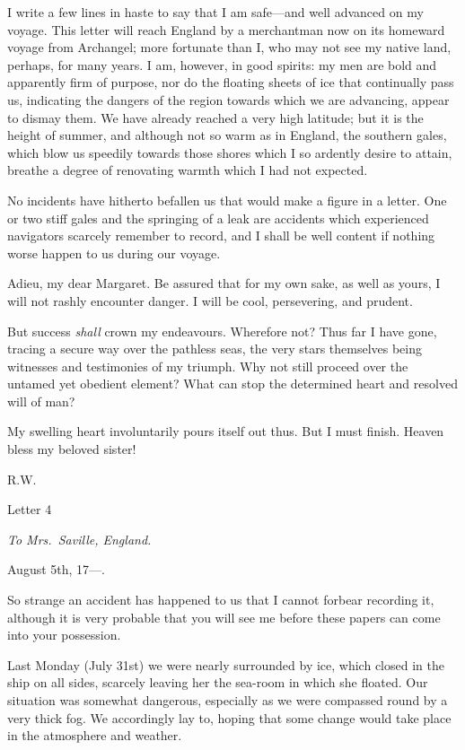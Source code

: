 \documentclass[12pt,openright]{book}
\begin{document}
I write a few lines in haste to say that I am safe—and well advanced on my voyage. This letter will reach England by a merchantman now on its homeward voyage from Archangel; more fortunate than I, who may not see my native land, perhaps, for many years. I am, however, in good spirits: my men are bold and apparently firm of purpose, nor do the floating sheets of ice that continually pass us, indicating the dangers of the region towards which we are advancing, appear to dismay them. We have already reached a very high latitude; but it is the height of summer, and although not so warm as in England, the southern gales, which blow us speedily towards those shores which I so ardently desire to attain, breathe a degree of renovating warmth which I had not expected.

No incidents have hitherto befallen us that would make a figure in a letter. One or two stiff gales and the springing of a leak are accidents which experienced navigators scarcely remember to record, and I shall be well content if nothing worse happen to us during our voyage.

Adieu, my dear Margaret. Be assured that for my own sake, as well as yours, I will not rashly encounter danger. I will be cool, persevering, and prudent.

But success \textit{shall} crown my endeavours. Wherefore not? Thus far I have gone, tracing a secure way over the pathless seas, the very stars themselves being witnesses and testimonies of my triumph. Why not still proceed over the untamed yet obedient element? What can stop the determined heart and resolved will of man?

My swelling heart involuntarily pours itself out thus. But I must finish. Heaven bless my beloved sister!

R.W.

Letter 4

\textit{To Mrs. Saville, England.}

August 5th, 17—.

So strange an accident has happened to us that I cannot forbear recording it, although it is very probable that you will see me before these papers can come into your possession.

Last Monday (July 31st) we were nearly surrounded by ice, which closed in the ship on all sides, scarcely leaving her the sea-room in which she floated. Our situation was somewhat dangerous, especially as we were compassed round by a very thick fog. We accordingly lay to, hoping that some change would take place in the atmosphere and weather.
\end{document}
